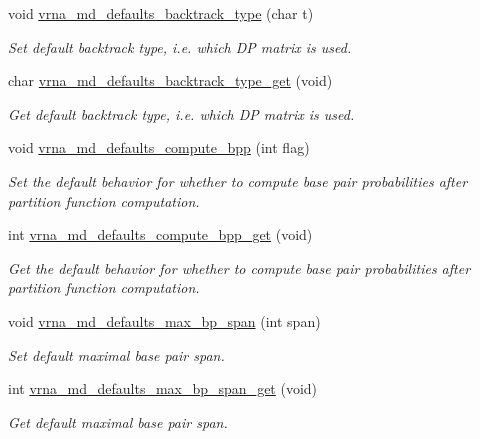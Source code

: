\begin{DoxyCompactItemize}
void \hyperlink{group__model__details_ga68305274de96b56b7799575e222560d8}{vrna\-\_\-md\-\_\-defaults\-\_\-backtrack\-\_\-type} (char t)
\begin{DoxyCompactList}\small\item\em Set default backtrack type, i.\-e. which D\-P matrix is used. \end{DoxyCompactList}\item 
char \hyperlink{group__model__details_ga1425b4ebd0e034dead66d79becd64143}{vrna\-\_\-md\-\_\-defaults\-\_\-backtrack\-\_\-type\-\_\-get} (void)
\begin{DoxyCompactList}\small\item\em Get default backtrack type, i.\-e. which D\-P matrix is used. \end{DoxyCompactList}\item 
void \hyperlink{group__model__details_gaf1b5db10f1f476767f9a95f8a78e3132}{vrna\-\_\-md\-\_\-defaults\-\_\-compute\-\_\-bpp} (int flag)
\begin{DoxyCompactList}\small\item\em Set the default behavior for whether to compute base pair probabilities after partition function computation. \end{DoxyCompactList}\item 
int \hyperlink{group__model__details_gaa3a537e61fbe0518673bf9f73fd820f3}{vrna\-\_\-md\-\_\-defaults\-\_\-compute\-\_\-bpp\-\_\-get} (void)
\begin{DoxyCompactList}\small\item\em Get the default behavior for whether to compute base pair probabilities after partition function computation. \end{DoxyCompactList}\item 
void \hyperlink{group__model__details_ga4c4bc962f09b4480cb8499f1cf8ae4ec}{vrna\-\_\-md\-\_\-defaults\-\_\-max\-\_\-bp\-\_\-span} (int span)
\begin{DoxyCompactList}\small\item\em Set default maximal base pair span. \end{DoxyCompactList}\item 
int \hyperlink{group__model__details_gaa60f989e062fecd4d4bac89c1883da85}{vrna\-\_\-md\-\_\-defaults\-\_\-max\-\_\-bp\-\_\-span\-\_\-get} (void)
\begin{DoxyCompactList}\small\item\em Get default maximal base pair span. \end{DoxyCompactList}\item 

\end{DoxyCompactItemize}
